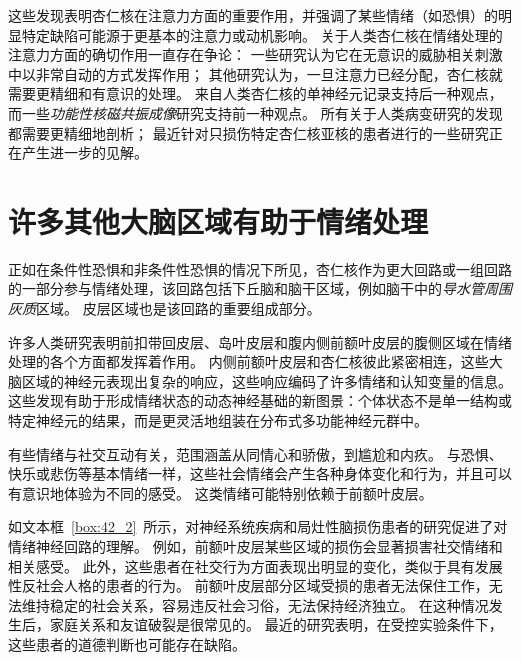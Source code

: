 这些发现表明杏仁核在注意力方面的重要作用，并强调了某些情绪（如恐惧）的明显特定缺陷可能源于更基本的注意力或动机影响。
关于人类杏仁核在情绪处理的注意力方面的确切作用一直存在争论：
一些研究认为它在无意识的威胁相关刺激中以非常自动的方式发挥作用；
其他研究认为，一旦注意力已经分配，杏仁核就需要更精细和有意识的处理。
来自人类杏仁核的单神经元记录支持后一种观点，而一些\textit{功能性核磁共振成像}研究支持前一种观点。
所有关于人类病变研究的发现都需要更精细地剖析；
最近针对只损伤特定杏仁核亚核的患者进行的一些研究正在产生进一步的见解。



\section{许多其他大脑区域有助于情绪处理}

正如在条件性恐惧和非条件性恐惧的情况下所见，杏仁核作为更大回路或一组回路的一部分参与情绪处理，该回路包括下丘脑和脑干区域，例如脑干中的\textit{导水管周围灰质}区域。
皮层区域也是该回路的重要组成部分。


许多人类研究表明前扣带回皮层、岛叶皮层和腹内侧前额叶皮层的腹侧区域在情绪处理的各个方面都发挥着作用。
内侧前额叶皮层和杏仁核彼此紧密相连，这些大脑区域的神经元表现出复杂的响应，这些响应编码了许多情绪和认知变量的信息。
这些发现有助于形成情绪状态的动态神经基础的新图景：个体状态不是单一结构或特定神经元的结果，而是更灵活地组装在分布式多功能神经元群中。


有些情绪与社交互动有关，范围涵盖从同情心和骄傲，到尴尬和内疚。
与恐惧、快乐或悲伤等基本情绪一样，这些社会情绪会产生各种身体变化和行为，并且可以有意识地体验为不同的感受。
这类情绪可能特别依赖于前额叶皮层。


如文本框~\ref{box:42_2}~所示，对神经系统疾病和局灶性脑损伤患者的研究促进了对情绪神经回路的理解。
例如，前额叶皮层某些区域的损伤会显著损害社交情绪和相关感受。
此外，这些患者在社交行为方面表现出明显的变化，类似于具有发展性反社会人格的患者的行为。
前额叶皮层部分区域受损的患者无法保住工作，无法维持稳定的社会关系，容易违反社会习俗，无法保持经济独立。
在这种情况发生后，家庭关系和友谊破裂是很常见的。
最近的研究表明，在受控实验条件下，这些患者的道德判断也可能存在缺陷。


